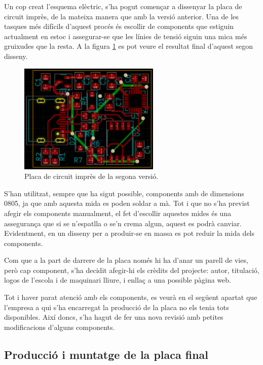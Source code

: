 Un cop creat l'esquema elèctric, s'ha pogut començar a dissenyar la placa de
circuit imprès, de la mateixa manera que amb la versió anterior. Una de les
tasques més difícils d'aquest procés és escollir  de components
que estiguin actualment en estoc i assegurar-se que les línies de tensió
siguin una mica més gruixudes que la resta. A la figura \ref{fig:pcb_v2}
es pot veure el resultat final d'aquest segon disseny.

\begin{figure}[ht]
    \centering
    \includegraphics[width=0.6\textwidth]{images/kicad/gyro2_pcb.png}
    \caption{Placa de circuit imprès de la segona versió.}
    \label{fig:pcb_v2}
\end{figure}

S'han utilitzat, sempre que ha sigut possible, components amb  
de dimensions 0805, ja que amb aquesta mida es poden soldar a mà. Tot i que no 
s'ha previst afegir els components manualment, el fet d'escollir aquestes mides 
és una assegurança que si se n'espatlla o se'n crema algun, aquest es podrà 
canviar. Evidentment, en un disseny per a produir-se en massa es pot reduir la 
mida dels components.

Com que a la part de darrere de la placa només hi ha d'anar un parell de vies,
però cap component, s'ha decidit afegir-hi els crèdits del projecte: autor,
titulació, logos de l'escola i de maquinari lliure, i enllaç a una possible
pàgina web.

Tot i haver parat atenció amb els components, es veurà en el següent apartat que
l'empresa a qui s'ha encarregat la producció de la placa no els tenia tots
disponibles. Així doncs, s'ha hagut de fer una nova revisió amb petites
modificacions d'alguns components.

\subsection{Producció i muntatge de la placa final}

